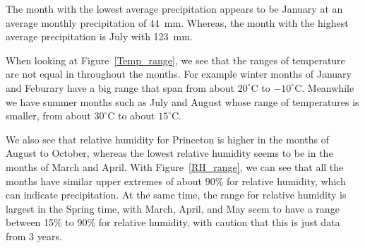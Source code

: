 \documentclass[11pt]{report}
\begin{document}
The month with the lowest average precipitation appears to be January at an average monthly precipitation of 44~mm. Whereas, the month with the highest average precipitation is July with 123~mm. 


When looking at Figure~\ref{Temp_range}, we see that the ranges of temperature are not equal in throughout the months. For example winter months of January and Feburary have a big range that span from about $20 ^\circ $C to $-10 ^\circ$C. Meanwhile we have summer months such as July and August whose range of temperatures is smaller, from about $30 ^\circ $C to about $15 ^\circ $C.


We also see that relative humidity for Princeton is higher in the months of August to October, whereas the lowest relative humidity seems to be in the months of March and April.
With Figure~\ref{RH_range}, we can see that all the months have similar upper extremes of about 90\% for relative humidity, which can indicate precipitation. At the same time, the range for relative humidity is largest in the Spring time, with March, April, and May seem to have a range between 15\% to 90\% for relative humidity, with caution that this is just data from 3 years. 
\end{document}
